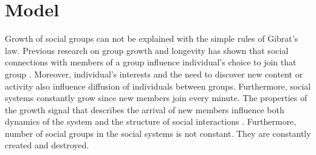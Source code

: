 





\section{Model \label{sec:model}}
Growth of social groups can not be explained with the simple rules of Gibrat's law. Previous research on group growth and longevity has shown that social connections with members of a group influence individual's choice to join that group \cite{kairam2012life, zheleva2009co}. Moreover, individual's interests and the need to discover new content or activity also influence diffusion of individuals between groups. Furthermore, social systems constantly grow since new members join every minute. The properties of the growth signal that describes the arrival of new members influence both dynamics of the system \cite{mitrovic2011quantitative, dankulov2015dynamics} and the structure of social interactions \cite{vranic2021growth}. Furthermore, number of social groups in the social systems is not constant. They are constantly created and destroyed.

